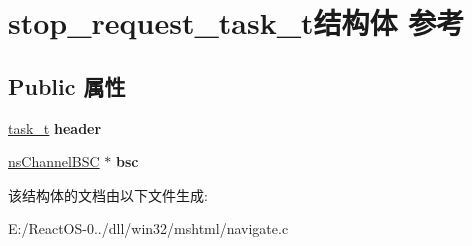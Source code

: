\hypertarget{structstop__request__task__t}{}\section{stop\+\_\+request\+\_\+task\+\_\+t结构体 参考}
\label{structstop__request__task__t}
\subsection*{Public 属性}
\begin{DoxyCompactItemize}
\item 
\mbox{\label{structstop__request__task__t_afc9f2ae751c1c7b8efb6e9059cf5a71c}} 
\hyperlink{structtask__t}{task\+\_\+t} {\bfseries header}
\item 
\mbox{\label{structstop__request__task__t_ac0966001ccf3f9f22216cec1fecbf9d6}} 
\hyperlink{structns_channel_b_s_c}{ns\+Channel\+B\+SC} $\ast$ {\bfseries bsc}
\end{DoxyCompactItemize}


该结构体的文档由以下文件生成\+:\begin{DoxyCompactItemize}
\item 
E\+:/\+React\+O\+S-\/0../dll/win32/mshtml/navigate.\+c\end{DoxyCompactItemize}
